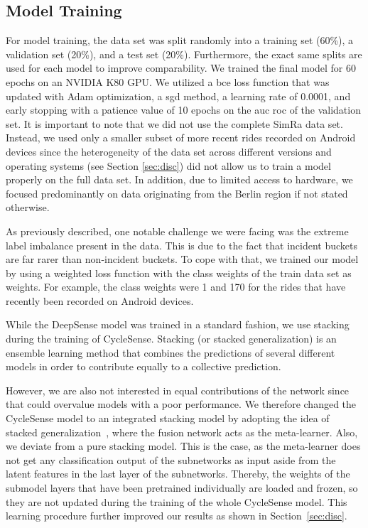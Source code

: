 \subsection{Model Training}
\label{subsec:model_training}
For model training, the data set was split randomly into a training set (60\%), a validation set (20\%), and a test set (20\%).
Furthermore, the exact same splits are used for each model to improve comparability.
We trained the final model for 60 epochs on an NVIDIA K80 GPU.
We utilized a \ac{bce} loss function that was updated with Adam optimization, a \ac{sgd} method, a learning rate of 0.0001, and early stopping with a patience value of 10 epochs on the \ac{auc} \ac{roc} of the validation set.
It is important to note that we did not use the complete SimRa data set.
Instead, we used only a smaller subset of more recent rides recorded on Android devices since the heterogeneity of the data set across different versions and operating systems (see Section \ref{sec:disc}) did not allow us to train a model properly on the full data set.
In addition, due to limited access to hardware, we focused predominantly on data originating from the Berlin region if not stated otherwise.

As previously described, one notable challenge we were facing was the extreme label imbalance present in the data.
This is due to the fact that incident buckets are far rarer than non-incident buckets.
To cope with that, we trained our model by using a weighted loss function with the class weights of the train data set as weights.
For example, the class weights were 1 and 170 for the rides that have recently been recorded on Android devices.

While the DeepSense model was trained in a standard fashion, we use stacking during the training of CycleSense.
Stacking (or stacked generalization) is an ensemble learning method that combines the predictions of several different models in order to contribute equally to a collective prediction.

However, we are also not interested in equal contributions of the network since that could overvalue models with a poor performance.
We therefore changed the CycleSense model to an integrated stacking model by adopting the idea of stacked generalization~\cite{wolpert1992stacked}, where the fusion network acts as the meta-learner.
Also, we deviate from a pure stacking model.
This is the case, as the meta-learner does not get any classification output of the subnetworks as input aside from the latent features in the last layer of the subnetworks.
Thereby, the weights of the submodel layers that have been pretrained individually are loaded and frozen, so they are not updated during the training of the whole CycleSense model.
This learning procedure further improved our results as shown in Section~\ref{sec:disc}.

